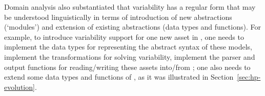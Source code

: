 Domain analysis also substantiated that variability has a regular form that may be understood linguistically in terms of introduction of new abstractions (`modules') and extension of existing abstractions (data types and functions). For example, to introduce variability support for one new asset in \hp, one needs to implement the data types for representing the abstract syntax of these models, implement the transformations for solving variability, implement the parser and output functions for reading/writing these assets into/from \hp; one also needs to extend some data types and functions of \hp{}, as it was illustrated in Section~\ref{sec:hp-evolution}.
